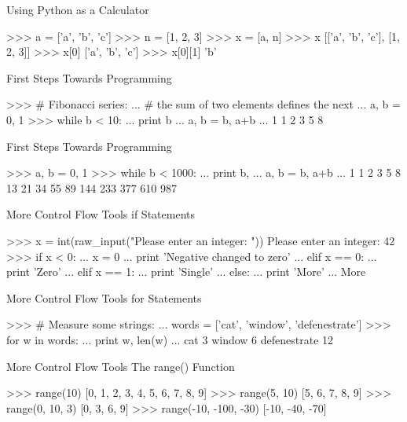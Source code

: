 \documentclass[11pt]{beamer}
\begin{document}
\begin{frame}[containsverbatim]{Using Python as a Calculator}
\begin{python}
>>> a = ['a', 'b', 'c']
>>> n = [1, 2, 3]
>>> x = [a, n]
>>> x
[['a', 'b', 'c'], [1, 2, 3]]
>>> x[0]
['a', 'b', 'c']
>>> x[0][1]
'b'
\end{python}
\end{frame}

\begin{frame}[containsverbatim]{First Steps Towards Programming}
\begin{python}
>>> # Fibonacci series:
... # the sum of two elements defines the next
... a, b = 0, 1
>>> while b < 10:
...    print b
...    a, b = b, a+b
...
1
1
2
3
5
8
\end{python}
\end{frame}


\begin{frame}[containsverbatim]{First Steps Towards Programming}
\begin{python}
>>> a, b = 0, 1
>>> while b < 1000:
...    print b,
...    a, b = b, a+b
...
1 1 2 3 5 8 13 21 34 55 89 144 233 377 610 987
\end{python}
\end{frame}


\begin{frame}[containsverbatim]{More Control Flow Tools}
if Statements
\begin{python}
>>> x = int(raw_input("Please enter an integer: "))
Please enter an integer: 42
>>> if x < 0:
...    x = 0
...    print 'Negative changed to zero'
... elif x == 0:
...    print 'Zero'
... elif x == 1:
...    print 'Single'
... else:
...    print 'More'
...
More
\end{python}
\end{frame}


\begin{frame}[containsverbatim]{More Control Flow Tools}
for Statements
\begin{python}
>>> # Measure some strings:
... words = ['cat', 'window', 'defenestrate']
>>> for w in words:
...    print w, len(w)
...
cat 3
window 6
defenestrate 12
\end{python}
\end{frame}


\begin{frame}[containsverbatim]{More Control Flow Tools}
The range() Function
\begin{python}
>>> range(10)
[0, 1, 2, 3, 4, 5, 6, 7, 8, 9]
>>> range(5, 10)
[5, 6, 7, 8, 9]
>>> range(0, 10, 3)
[0, 3, 6, 9]
>>> range(-10, -100, -30)
[-10, -40, -70]
\end{python}
\end{frame}
\end{document}
